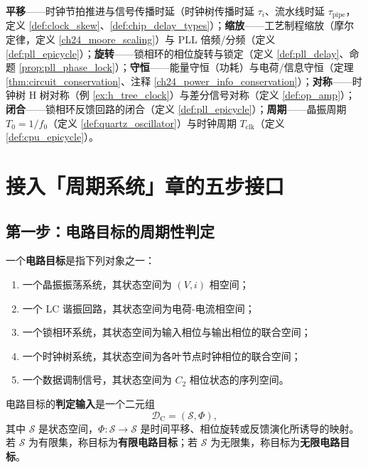 \begin{remark}[本章七主题导引]\label{rem:circuit_seven_themes}
\textbf{平移}——时钟节拍推进与信号传播时延（时钟树传播时延 $\tau_i$、流水线时延 $\tau_{\text{pipe}}$，定义 \ref{def:clock_skew}、\ref{def:chip_delay_types}）；\textbf{缩放}——工艺制程缩放（摩尔定律，定义 \ref{ch24_moore_scaling}）与 PLL 倍频/分频（定义 \ref{def:pll_epicycle}）；\textbf{旋转}——锁相环的相位旋转与锁定（定义 \ref{def:pll_delay}、命题 \ref{prop:pll_phase_lock}）；\textbf{守恒}——能量守恒（功耗）与电荷/信息守恒（定理 \ref{thm:circuit_conservation}、注释 \ref{ch24_power_info_conservation}）；\textbf{对称}——时钟树 H 树对称（例 \ref{ex:h_tree_clock}）与差分信号对称（定义 \ref{def:op_amp}）；\textbf{闭合}——锁相环反馈回路的闭合（定义 \ref{def:pll_epicycle}）；\textbf{周期}——晶振周期 $T_0=1/f_0$（定义 \ref{def:quartz_oscillator}）与时钟周期 $T_{\text{clk}}$（定义 \ref{def:cpu_epicycle}）。
\end{remark}

\section{接入「周期系统」章的五步接口}
\label{sec:circuit_five_steps}

\subsection{第一步：电路目标的周期性判定}

\begin{definition}[电路目标与判定输入]\label{def:circuit_target}
一个\textbf{电路目标}是指下列对象之一：
\begin{enumerate}[label=(\roman*)]
    \item 一个晶振振荡系统，其状态空间为 $(V,i)$ 相空间；
    \item 一个 LC 谐振回路，其状态空间为电荷-电流相空间；
    \item 一个锁相环系统，其状态空间为输入相位与输出相位的联合空间；
    \item 一个时钟树系统，其状态空间为各叶节点时钟相位的联合空间；
    \item 一个数据调制信号，其状态空间为 $C_2$ 相位状态的序列空间。
\end{enumerate}
电路目标的\textbf{判定输入}是一个二元组
\[
\mathcal D_{\mathrm{C}}=(\mathcal S,\Phi),
\]
其中 $\mathcal S$ 是状态空间，$\Phi:\mathcal S\to\mathcal S$ 是时间平移、相位旋转或反馈演化所诱导的映射。若 $\mathcal S$ 为有限集，称目标为\textbf{有限电路目标}；若 $\mathcal S$ 为无限集，称目标为\textbf{无限电路目标}。
\end{definition}

